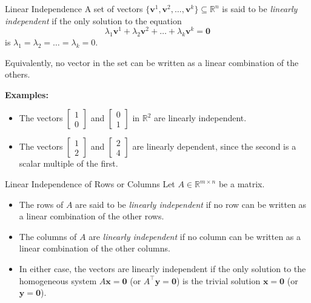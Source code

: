 \begin{definition}{Linear Independence}{}{}
A set of vectors \( \{ \mathbf{v}^1, \mathbf{v}^2, \dots, \mathbf{v}^k \} \subseteq \mathbb{R}^n \) is said to be \emph{linearly independent} if the only solution to the equation
\[
\lambda_1 \mathbf{v}^1 + \lambda_2 \mathbf{v}^2 + \dots + \lambda_k \mathbf{v}^k = \mathbf{0}
\]
is \( \lambda_1 = \lambda_2 = \dots = \lambda_k = 0 \).  

Equivalently, no vector in the set can be written as a linear combination of the others.
\end{definition}

\textbf{Examples:}
\begin{itemize}
    \item The vectors \( \begin{bmatrix}1\\0\end{bmatrix} \) and \( \begin{bmatrix}0\\1\end{bmatrix} \) in \( \mathbb{R}^2 \) are linearly independent.
    \item The vectors \( \begin{bmatrix}1\\2\end{bmatrix} \) and \( \begin{bmatrix}2\\4\end{bmatrix} \) are linearly dependent, since the second is a scalar multiple of the first.
\end{itemize}

\vspace{1em}

\begin{definition}{Linear Independence of Rows or Columns}{}{}
Let \( A \in \mathbb{R}^{m \times n} \) be a matrix.

\begin{itemize}
  \item The rows of \( A \) are said to be \emph{linearly independent} if no row can be written as a linear combination of the other rows.
  
  \item The columns of \( A \) are \emph{linearly independent} if no column can be written as a linear combination of the other columns.
  
  \item In either case, the vectors are linearly independent if the only solution to the homogeneous system \( A \mathbf{x} = \mathbf{0} \) (or \( A^\top \mathbf{y} = \mathbf{0} \)) is the trivial solution \( \mathbf{x} = \mathbf{0} \) (or \( \mathbf{y} = \mathbf{0} \)).
\end{itemize}
\end{definition}

